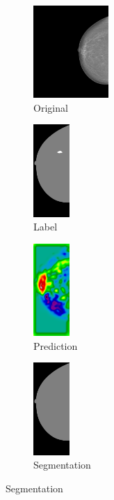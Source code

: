 \documentclass{beamer}
\begin{document}
\begin{frame}
\begin{figure}[h]
\begin{subfigure}{0.25\textwidth}
				\centering
					\includegraphics[height = 3.5cm]{plots/mammogram_ex2.png}
				\caption{Original}
			\end{subfigure}
			\begin{subfigure}{0.16\textwidth}
				\centering
					\includegraphics[height = 3.5cm]{plots/label_ex2.png}
				\caption{Label}
			\end{subfigure}
			\begin{subfigure}{0.16\textwidth}
				\centering
					\includegraphics[height = 3.5cm]{plots/logits_ex2_v2.png}
				\caption{Prediction}
			\end{subfigure}
			\begin{subfigure}{0.22\textwidth}
				\centering
					\includegraphics[height = 3.5cm]{plots/segmentation_ex2_v2.png}
				\caption{Segmentation}
			\end{subfigure}%
		\end{figure}		
	\end{frame}
	
\end{document}

